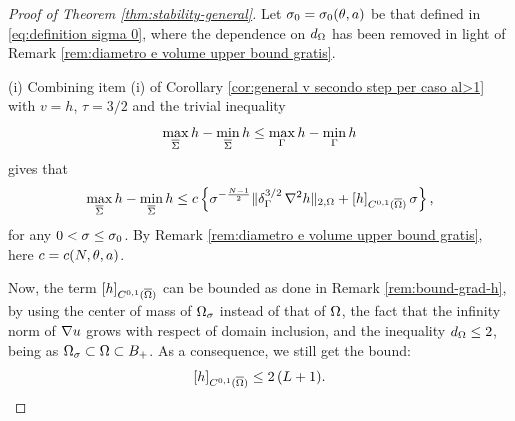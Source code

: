 \documentclass[a4paper,10pt]{amsart}
\numberwithin{equation}{section}
\begin{document}
\begin{proof}[Proof of Theorem \ref{thm:stability-general}]
Let $\sigma_0= \sigma_0 ( \theta , a )$ be that defined in \eqref{eq:definition sigma 0}, where the dependence on $d_\Omega$ has been removed in light of Remark \ref{rem:diametro e volume upper bound gratis}.	

(i) Combining item (i) of Corollary \ref{cor:general v secondo step per caso al>1} with $v=h$, $\tau=3/2$ and the trivial inequality
\begin{equation}\label{eq:oscillation altra trivial diversa}
\max_{\overline{\Sigma}} h -\min_{\overline{\Sigma}} h \le \max_{\Gamma} h -\min_{\Gamma} h
\end{equation}
gives that
\begin{equation*}
\max_{ \overline{\Sigma} } h - \min_{ \overline{\Sigma} } h \le  c \left\{ \sigma^{ -\frac{N-1}{2} } \Vert \delta_{\Gamma}^{3/2} \, \nabla^2 h  \Vert_{2, \Omega } + [h]_{C^{0,1}(\overline{\Omega})} \, \sigma \right\},
\end{equation*}
for any $0<\sigma \le \sigma_0$. By Remark \ref{rem:diametro e volume upper bound gratis}, here $c=c(N, \theta , a)$.
\par
Now, the term $[h]_{C^{0,1}(\overline{\Omega})}$ can be bounded as done in Remark \ref{rem:bound-grad-h}, by using the center of mass of $\Omega_\sigma$ instead of that of $\Omega$, the fact that the infinity norm of $\nabla u$
grows with respect of domain inclusion, and the inequality $d_\Omega\le 2$, being as $\Omega_\sigma\subset\Omega\subset B_+$. 
As a consequence, we still get the bound:
\begin{equation*}
[h]_{C^{0,1}(\overline{\Omega})}\le 2\,(L+1).
\end{equation*}
%
%


\end{proof}
\end{document}

